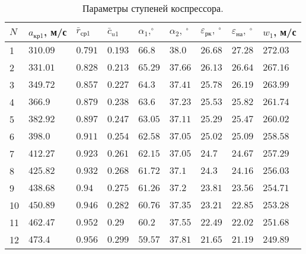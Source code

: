 \documentclass[a4paper,10pt]{article}
\begin{document}
     \begin{longtable}{|p{0.6cm}|p{1.2cm}|p{1.2cm}|p{1.2cm}|p{1.2cm}|p{1.2cm}|p{1.2cm}|p{1.2cm}|p{1.2cm}|}
        \caption{Параметры ступеней коспрессора.}\\ \hline
        $N$ & $a_{кр1}$, м/с & $\bar{r}_{ср1}$ & $\bar{c}_{u1}$ & $\alpha_1, ^\circ$ & $\alpha_2,\ ^\circ$ &
        $\varepsilon_{рк},\ ^\circ$ & $\varepsilon_{на},\ ^\circ$ & $w_1$, м/с  \\ \hline
%        
        1 & $310.09$ & $0.791$ &
        $0.193$ & $66.8$ & $38.0$ &
        $26.68$ & $27.28$ &
        $272.03$ \\ \hline
%        
        2 & $331.01$ & $0.828$ &
        $0.213$ & $65.29$ & $37.66$ &
        $26.13$ & $26.64$ &
        $267.16$ \\ \hline
%        
        3 & $349.72$ & $0.857$ &
        $0.227$ & $64.3$ & $37.41$ &
        $25.78$ & $26.19$ &
        $263.99$ \\ \hline
%        
        4 & $366.9$ & $0.879$ &
        $0.238$ & $63.6$ & $37.23$ &
        $25.53$ & $25.82$ &
        $261.74$ \\ \hline
%        
        5 & $382.92$ & $0.897$ &
        $0.247$ & $63.05$ & $37.11$ &
        $25.29$ & $25.47$ &
        $260.02$ \\ \hline
%        
        6 & $398.0$ & $0.911$ &
        $0.254$ & $62.58$ & $37.05$ &
        $25.02$ & $25.09$ &
        $258.58$ \\ \hline
%        
        7 & $412.27$ & $0.923$ &
        $0.261$ & $62.15$ & $37.05$ &
        $24.7$ & $24.67$ &
        $257.29$ \\ \hline
%        
        8 & $425.82$ & $0.932$ &
        $0.268$ & $61.72$ & $37.1$ &
        $24.3$ & $24.16$ &
        $256.03$ \\ \hline
%        
        9 & $438.68$ & $0.94$ &
        $0.275$ & $61.26$ & $37.2$ &
        $23.81$ & $23.56$ &
        $254.71$ \\ \hline
%        
        10 & $450.89$ & $0.946$ &
        $0.282$ & $60.76$ & $37.35$ &
        $23.21$ & $22.85$ &
        $253.28$ \\ \hline
%        
        11 & $462.47$ & $0.952$ &
        $0.29$ & $60.2$ & $37.55$ &
        $22.49$ & $22.02$ &
        $251.68$ \\ \hline
%        
        12 & $473.4$ & $0.956$ &
        $0.299$ & $59.57$ & $37.81$ &
        $21.65$ & $21.19$ &
        $249.89$ \\ \hline
%        
    \end{longtable}
\end{document}
